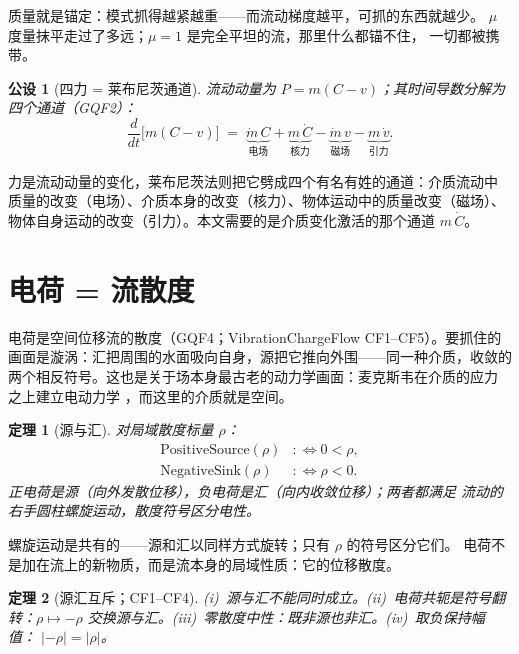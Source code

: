 \documentclass[aps,prd,preprint,superscriptaddress,amsmath,amssymb]{revtex4-2}
\newtheorem{postulate}{公设}[section]
\newtheorem{theorem}{定理}[section]
\begin{document}
质量就是锚定：模式抓得越紧越重——而流动梯度越平，可抓的东西就越少。
$\mu$ 度量抹平走过了多远；$\mu=1$ 是完全平坦的流，那里什么都锚不住，
一切都被携带。

\begin{postulate}[四力 = 莱布尼茨通道]
\label{post:four}
流动动量为 $P=m(C-v)$；其时间导数分解为四个通道（GQF2）：
\begin{equation}
\label{eq:four}
\frac{d}{dt}\bigl[m(C-v)\bigr]
\;=\;\underbrace{\dot m\,C}_{\text{电场}}
+\underbrace{m\,\dot C}_{\text{核力}}
-\underbrace{\dot m\,v}_{\text{磁场}}
-\underbrace{m\,\dot v}_{\text{引力}} .
\end{equation}
\end{postulate}

力是流动动量的变化，莱布尼茨法则把它劈成四个有名有姓的通道：介质流动中
质量的改变（电场）、介质本身的改变（核力）、物体运动中的质量改变（磁场）、
物体自身运动的改变（引力）。本文需要的是介质变化激活的那个通道
$m\,\dot C$。

\section{电荷 = 流散度}
\label{sec:charge}

电荷是空间位移流的散度（GQF4；VibrationChargeFlow CF1--CF5）。要抓住的
画面是漩涡：汇把周围的水面吸向自身，源把它推向外围——同一种介质，收敛的
两个相反符号。这也是关于场本身最古老的动力学画面：麦克斯韦在介质的应力
之上建立电动力学 \cite{maxwell1996dynamical}，而这里的介质就是空间。

\begin{theorem}[源与汇]
\label{def:srcsink}
对局域散度标量 $\rho$：
\begin{align}
\text{PositiveSource}(\rho) &:\Longleftrightarrow 0<\rho ,\\
\text{NegativeSink}(\rho)   &:\Longleftrightarrow \rho<0 .
\end{align}
正电荷是源（向外发散位移），负电荷是汇（向内收敛位移）；两者都满足
流动的右手圆柱螺旋运动，散度符号区分电性。
\end{theorem}

螺旋运动是共有的——源和汇以同样方式旋转；只有 $\rho$ 的符号区分它们。
电荷不是加在流上的新物质，而是流本身的局域性质：它的位移散度。

\begin{theorem}[源汇互斥；CF1--CF4]
\label{thm:srcsink}
(i)~源与汇不能同时成立。(ii)~电荷共轭是符号翻转：$\rho\mapsto-\rho$
交换源与汇。(iii)~零散度中性：既非源也非汇。(iv)~取负保持幅值：
$|{-}\rho|=|\rho|$。
\end{theorem}
\end{document}
